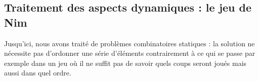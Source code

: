 






\subsection{Traitement des aspects dynamiques : le jeu de Nim}\label{chap:touist:touist:sat-dynamique}%
Jusqu'ici, nous avons traité de problèmes combinatoires statiques : la solution ne nécessite pas d'ordonner une série d'éléments contrairement à ce qui se passe par exemple dans un jeu où il ne suffit pas de savoir quels coups seront joués mais aussi dans quel ordre. 

